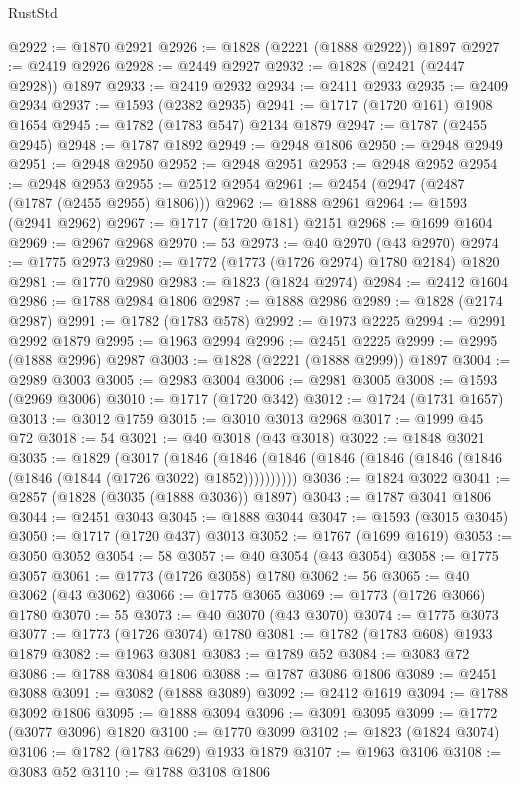\begin{lexlean}{RustStd}
\begin{coremodule}
@2922 := @1870 @2921
@2926 := @1828 (@2221 (@1888 @2922)) @1897
@2927 := @2419 @2926
@2928 := @2449 @2927
@2932 := @1828 (@2421 (@2447 @2928)) @1897
@2933 := @2419 @2932
@2934 := @2411 @2933
@2935 := @2409 @2934
@2937 := @1593 (@2382 @2935)
@2941 := @1717 (@1720 @161) @1908 @1654
@2945 := @1782 (@1783 @547) @2134 @1879
@2947 := @1787 (@2455 @2945)
@2948 := @1787 @1892
@2949 := @2948 @1806
@2950 := @2948 @2949
@2951 := @2948 @2950
@2952 := @2948 @2951
@2953 := @2948 @2952
@2954 := @2948 @2953
@2955 := @2512 @2954
@2961 := @2454 (@2947 (@2487 (@1787 (@2455 @2955) @1806)))
@2962 := @1888 @2961
@2964 := @1593 (@2941 @2962)
@2967 := @1717 (@1720 @181) @2151
@2968 := @1699 @1604
@2969 := @2967 @2968
@2970 := 53
@2973 := @40 @2970 (@43 @2970)
@2974 := @1775 @2973
@2980 := @1772 (@1773 (@1726 @2974) @1780 @2184) @1820
@2981 := @1770 @2980
@2983 := @1823 (@1824 @2974)
@2984 := @2412 @1604
@2986 := @1788 @2984 @1806
@2987 := @1888 @2986
@2989 := @1828 (@2174 @2987)
@2991 := @1782 (@1783 @578)
@2992 := @1973 @2225
@2994 := @2991 @2992 @1879
@2995 := @1963 @2994
@2996 := @2451 @2225
@2999 := @2995 (@1888 @2996) @2987
@3003 := @1828 (@2221 (@1888 @2999)) @1897
@3004 := @2989 @3003
@3005 := @2983 @3004
@3006 := @2981 @3005
@3008 := @1593 (@2969 @3006)
@3010 := @1717 (@1720 @342)
@3012 := @1724 (@1731 @1657)
@3013 := @3012 @1759
@3015 := @3010 @3013 @2968
@3017 := @1999 @45 @72
@3018 := 54
@3021 := @40 @3018 (@43 @3018)
@3022 := @1848 @3021
@3035 := @1829
    (@3017
      (@1846 (@1846 (@1846 (@1846 (@1846 (@1846 (@1846 (@1846 (@1844 (@1726 @3022) @1852))))))))))
@3036 := @1824 @3022
@3041 := @2857 (@1828 (@3035 (@1888 @3036)) @1897)
@3043 := @1787 @3041 @1806
@3044 := @2451 @3043
@3045 := @1888 @3044
@3047 := @1593 (@3015 @3045)
@3050 := @1717 (@1720 @437) @3013
@3052 := @1767 (@1699 @1619)
@3053 := @3050 @3052
@3054 := 58
@3057 := @40 @3054 (@43 @3054)
@3058 := @1775 @3057
@3061 := @1773 (@1726 @3058) @1780
@3062 := 56
@3065 := @40 @3062 (@43 @3062)
@3066 := @1775 @3065
@3069 := @1773 (@1726 @3066) @1780
@3070 := 55
@3073 := @40 @3070 (@43 @3070)
@3074 := @1775 @3073
@3077 := @1773 (@1726 @3074) @1780
@3081 := @1782 (@1783 @608) @1933 @1879
@3082 := @1963 @3081
@3083 := @1789 @52
@3084 := @3083 @72
@3086 := @1788 @3084 @1806
@3088 := @1787 @3086 @1806
@3089 := @2451 @3088
@3091 := @3082 (@1888 @3089)
@3092 := @2412 @1619
@3094 := @1788 @3092 @1806
@3095 := @1888 @3094
@3096 := @3091 @3095
@3099 := @1772 (@3077 @3096) @1820
@3100 := @1770 @3099
@3102 := @1823 (@1824 @3074)
@3106 := @1782 (@1783 @629) @1933 @1879
@3107 := @1963 @3106
@3108 := @3083 @52
@3110 := @1788 @3108 @1806

\end{coremodule}
\end{lexlean}

